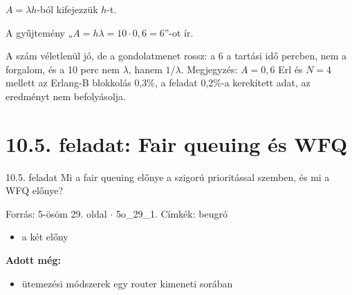 $A=\lambda h$-ból kifejezzük $h$-t.

\begin{center}\end{center}
\begin{tipp}
A gyűjtemény „$A=h\lambda=10\cdot0{,}6=6$”-ot ír.
\end{tipp}
\begin{figyelem}[Javítás]
A szám véletlenül jó, de a gondolatmenet rossz: a 6 a tartási idő percben, nem a forgalom, és a 10 perc nem $\lambda$, hanem $1/\lambda$. Megjegyzés: $A=0{,}6$ Erl és $N=4$ mellett az Erlang-B blokkolás 0,3\%, a feladat 0,2\%-a kerekített adat, az eredményt nem befolyásolja.
\end{figyelem}
\begin{eredmeny}

\begin{center}\end{center}
\end{eredmeny}


\section{\texorpdfstring{10.5. feladat: Fair queuing és WFQ}{10.5. feladat: Fair queuing és WFQ}}\label{o10_05}
\setcounter{lepes}{0}
\begin{feladat}{10.5. feladat}
Mi a fair queuing előnye a szigorú prioritással szemben, és mi a WFQ előnye?

{\footnotesize\sffamily Forrás: 5-ösöm 29. oldal $\cdot$ 5o\_29\_1. Címkék: beugró}
\end{feladat}
\begin{keresunk}
\begin{itemize}
\item a két előny
\end{itemize}
\end{keresunk}
\begin{jeloles}
\par\smallskip\textbf{Adott még:}
\begin{itemize}
\item ütemezési módszerek egy router kimeneti sorában
\end{itemize}
\end{jeloles}

